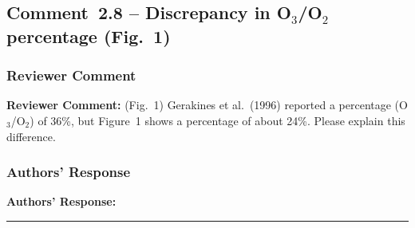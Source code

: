 \documentclass[12pt]{article}
\newcommand{\reviewlabel}{\textbf{\textcolor{commentframe}{Reviewer Comment:}}}
\newcommand{\responselabel}{\textbf{\textcolor{responseframe}{Authors' Response:}}}
\begin{document}
\subsection{Comment~2.8 -- Discrepancy in O$_3$/O$_2$ percentage (Fig.~1)}

\subsubsection{Reviewer Comment}
\begin{reviewerbox}
\reviewlabel{} (Fig.~1) Gerakines et al.\ (1996) reported a percentage
(O$_3$/O$_2$) of 36\%, but Figure~1 shows a percentage of about 24\%. Please
explain this difference.
\end{reviewerbox}

\subsubsection{Authors' Response}
\begin{responsebox}
\responselabel{}

\end{responsebox}

\bigskip
\hrule
\bigskip



\end{document}
